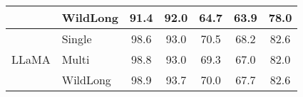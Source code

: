 \begin{table}[ht]
\begin{minipage}[b]{0.45\textwidth}
{\begin{tabular}{ll|ccccc}
                           & WildLong          & 91.4	 & 92.0	 & 64.7	 & 63.9	 & 78.0 \\
\midrule               
\multirow{3}{*}{LLaMA}     & Single            & 98.6	& 93.0	& 70.5	& 68.2	& 82.6 \\
                           & Multi             & 98.8	 & 93.0	 & 69.3	 & 67.0	 & 82.0 \\
                           & WildLong          & 98.9	 & 93.7	 & 70.0	 & 67.7	 & 82.6 \\
\bottomrule
\end{tabular}
\label{tab:ablation_multi}}
\end{minipage}
\end{table}




